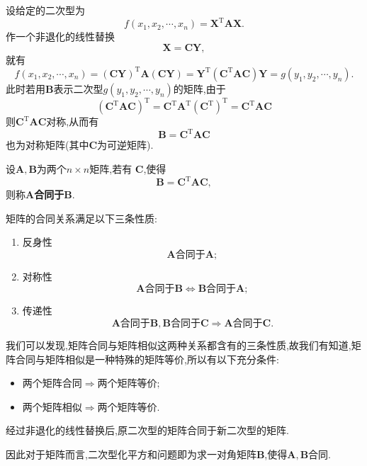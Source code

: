 \documentclass[9pt,a4paper]{book}
\begin{document}
{\kaishu
设给定的二次型为\[ 	f( x_1,x_2,\cdots,x_n )=\bm{X}^{\mathrm{T}}\bm{AX}. \]
作一个非退化的线性替换\[ \bm{X}=\bm{CY}, \]
就有\[ 	f( x_1,x_2,\cdots,x_n )=(\bm{CY})^{\mathrm{T}}\bm{A}(\bm{CY})=\bm{Y}^{\mathrm{T}}(\bm{C}^{\mathrm{T}}\bm{AC})\bm{Y}=g(y_1,y_2,\cdots,y_n). \]
此时若用$ \bm{B} $表示二次型$ g(y_1,y_2,\cdots,y_n) $的矩阵,由于\[ (\bm{C}^{\mathrm{T}}\bm{AC})^{\mathrm{T}}=\bm{C}^{\mathrm{T}}\bm{A}^{\mathrm{T}}(\bm{C}^{\mathrm{T}})^{\mathrm{T}}=\bm{C}^{\mathrm{T}}\bm{AC} \]则$ \bm{C}^{\mathrm{T}}\bm{AC} $对称,从而有\[ \bm{B}=\bm{C}^{\mathrm{T}}\bm{AC}  \]也为对称矩阵(其中$ \bm{C} $为可逆矩阵).
}
\begin{defination}[矩阵合同的定义]
	设$\bm{A},\bm{B}$为两个$ n\times n $矩阵,若有 $ \bm{C} $,使得\[ \bm{B}=\bm{C}^{\mathrm{T}}\bm{AC} ,\]则称$ \bm{A} $\textbf{合同于}$ \bm{B} $.
\end{defination}
\begin{feature}[合同矩阵的性质]
	矩阵的合同关系满足以下三条性质:
	\begin{enumerate}
		\item 反身性\[ \bm{A}\mbox{合同于}\bm{A}; \]
		\item 对称性\[  \bm{A}\mbox{合同于}\bm{B}\Leftrightarrow\bm{B}\mbox{合同于}\bm{A};\]
		\item 传递性\[ \bm{A}\mbox{合同于}\bm{B} ,\bm{B}\mbox{合同于}\bm{C}\Rightarrow  \bm{A}\mbox{合同于}\bm{C}.\]
	\end{enumerate}
	我们可以发现,矩阵合同与矩阵相似这两种关系都含有的三条性质,故我们有知道,矩阵合同与矩阵相似是一种特殊的矩阵等价,所以有以下充分条件:
	\begin{itemize}
	\item
$  \mbox{两个矩阵合同}\Rightarrow\mbox{两个矩阵等价}; $
 \item
$  \mbox{两个矩阵相似}\Rightarrow\mbox{两个矩阵等价}. $
\end{itemize}
\end{feature}
\begin{theorem}
	经过非退化的线性替换后,原二次型的矩阵合同于新二次型的矩阵.
\end{theorem}

因此对于矩阵而言,二次型化平方和问题即为求一对角矩阵$ \bm{B} $,使得$ \bm{A},\bm{B} $合同.
\end{document}
